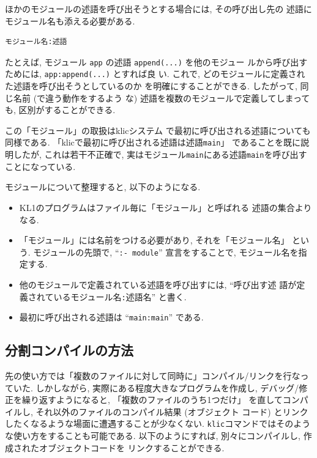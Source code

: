 \documentclass[a4,titlepage]{jsreport}
\begin{document}
ほかのモジュールの述語を呼び出そうとする場合には, その呼び出し先の
述語にモジュール名も添える必要がある.

\begin{center}
\begin{minipage}{6cm}
\begin{Verbatim}[frame=single]
 モジュール名:述語
\end{Verbatim}
\end{minipage}
\end{center}

たとえば, モジュール {\tt app} の述語 {\tt append(...)} を他のモジュー
ルから呼び出すためには, {\tt app:\linebreak[1]append(...)} とすれば良
い.  これで, どのモジュールに定義された述語を呼び出そうとしているのか
を明確にすることができる.  したがって, 同じ名前 (で違う動作をするよう
な) 述語を複数のモジュールで定義してしまっても, 区別がすることができる.

この「モジュール」の取扱はklicシステム
で最初に呼び出される述語についても同様である.  
「klicで最初に呼び出される述語は述語\verb|main|」
であることを既に説明したが, これは若干不正確で, 
実はモジュール\verb|main|にある述語\verb|main|を呼び出すことになっている.  

モジュールについて整理すると, 以下のようになる.  

\begin{itemize}
\item KL1のプログラムはファイル毎に「モジュール」と呼ばれる
述語の集合よりなる.  

\item 「モジュール」には名前をつける必要があり, それを「モジュール名」
という.  モジュールの先頭で, ``\verb|:- module|'' 宣言をすることで, 
モジュール名を指定する.

\item 他のモジュールで定義されている述語を呼び出すには, ``呼び出す述
語が定義されているモジュール名\verb|:|述語名'' と書く.

\item 最初に呼び出される述語は ``\verb|main:main|'' である.  
\end{itemize}

\subsection{分割コンパイルの方法}

先の使い方では「複数のファイルに対して同時に」コンパイル/リンクを行なっていた.  
しかしながら, 実際にある程度大きなプログラムを作成し, 
デバッグ/修正を繰り返すようになると, 
「複数のファイルのうち1つだけ」
を直してコンパイルし, それ以外のファイルのコンパイル結果 (オブジェクト
コード) とリンクしたくなるような場面に遭遇することが少なくない.  
\verb|klic|コマンドではそのような使い方をすることも可能である.  
以下のようにすれば, 別々にコンパイルし, 作成されたオブジェクトコードを
リンクすることができる.  
\end{document}
